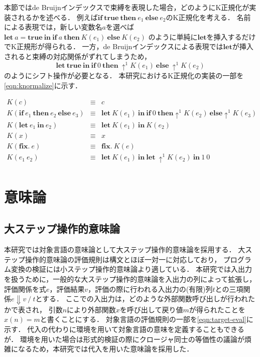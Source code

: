 \documentclass[T]{compsoft}
\newcommand{\keyword}[1]{\mathbf{#1}}
\newcommand{\TRUE}{\keyword{true}}
\newcommand{\IF}{\keyword{if}}
\newcommand{\THEN}{\keyword{then}}
\newcommand{\ELSE}{\keyword{else}}
\newcommand{\LET}{\keyword{let}}
\newcommand{\FIX}{\keyword{fix}}
\newcommand{\IN}{\keyword{in}}
\begin{document}
本節ではde Bruijnインデックスで束縛を表現した場合，どのようにK正規化が実装されるかを述べる．
例えば$\IF~\TRUE~\THEN~e_1~\ELSE~e_2$のK正規化を考える．
名前による表現では，新しい変数名$a$を選べば$\LET~a = \TRUE~\IN~\IF~a~\THEN~K(e_1)~\ELSE~K(e_2)$
のように単純に$\LET$を挿入するだけでK正規形が得られる．
一方，de Bruijnインデックスによる表現では$\LET$が挿入されると束縛の対応関係がずれてしまうため，
\[\LET~\TRUE~\IN~\IF~0~\THEN~\uparrow^1 K(e_1)~\ELSE~\uparrow^1 K(e_2)\]
のようにシフト操作が必要となる．
本研究におけるK正規化の実装の一部を\figurename\ref{eqn:knormalize}に示す．

\begin{figure*}[tp]
	\[\begin{array}{rcl}
		K(c) & \equiv & c \\
		K(\IF~e_1~\THEN~e_2~\ELSE~e_3) & \equiv & \LET~ K(e_1)~\IN~\IF~0~\THEN\uparrow^1 K(e_2)~\ELSE\uparrow^1 K(e_3) \\
		K(\LET~ e_1~\IN~e_2) & \equiv & \LET~K(e_1)~\IN~K(e_2) \\ 
		K(x) & \equiv & x \\
		K(\FIX.~e) & \equiv & \FIX.~K(e) \\
		K(e_1~e_2) & \equiv & \LET~ K(e_1)~\IN~\LET~\uparrow^1 K(e_2)~\IN~1~0 \\
	\end{array}\]
	\caption{K正規化の実装の一部}
	\label{eqn:knormalize}
\end{figure*}

\section{意味論}\label{section:semantics}

\subsection{大ステップ操作的意味論}
本研究では対象言語の意味論として大ステップ操作的意味論を採用する．
大ステップ操作的意味論の評価規則は構文とほぼ一対一に対応しており，
プログラム変換の検証には小ステップ操作的意味論より適している．
本研究では入出力を扱うために，一般的な大ステップ操作的意味論を入出力の列によって拡張し，
評価関係を式$e$，評価結果$v$，評価の際に行われる入出力の(有限)列$t$との三項関係$e \Downarrow v~/~t$とする．
ここでの入出力は，どのような外部関数呼び出しが行われたかで表され，
引数$n$により外部関数$x$を呼び出して戻り値$m$が得られたことを$x(n)=m$と書くことにする．
対象言語の評価規則の一部を\figurename\ref{eqn:target-eval}に示す．
代入の代わりに環境を用いて対象言語の意味を定義することもできるが．
環境を用いた場合は形式的検証の際にクロージャ同士の等価性の議論が煩雑になるため，本研究では代入を用いた意味論を採用した．
\end{document}

